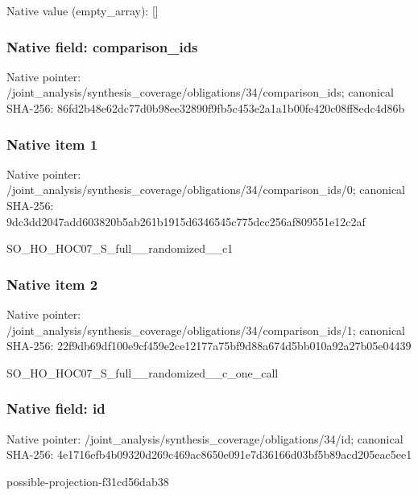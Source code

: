 \documentclass[10pt,a4paper]{article}
\begin{document}
Native value (empty\_\allowbreak{}array): []

\subsubsection{Native field: comparison\_\allowbreak{}ids}
Native pointer: /joint\_\allowbreak{}analysis/synthesis\_\allowbreak{}coverage/obligations/34/comparison\_\allowbreak{}ids; canonical SHA-256: 86fd2b48e62dc77d0b98ee32890f9fb5c453e2a1a1b00fe420c08ff8edc4d86b

\subsubsection{Native item 1}
Native pointer: /joint\_\allowbreak{}analysis/synthesis\_\allowbreak{}coverage/obligations/34/comparison\_\allowbreak{}ids/0; canonical SHA-256: 9dc3dd2047add603820b5ab261b1915d6346545c775dcc256af809551e12c2af

\begingroup\raggedright\sloppy SO\_\allowbreak{}HO\_\allowbreak{}HOC07\_\allowbreak{}S\_\allowbreak{}full\_\allowbreak{}\_\allowbreak{}randomized\_\allowbreak{}\_\allowbreak{}c1\par\endgroup

\subsubsection{Native item 2}
Native pointer: /joint\_\allowbreak{}analysis/synthesis\_\allowbreak{}coverage/obligations/34/comparison\_\allowbreak{}ids/1; canonical SHA-256: 22f9db69df100e9cf459e2ce12177a75bf9d88a674d5bb010a92a27b05e04439

\begingroup\raggedright\sloppy SO\_\allowbreak{}HO\_\allowbreak{}HOC07\_\allowbreak{}S\_\allowbreak{}full\_\allowbreak{}\_\allowbreak{}randomized\_\allowbreak{}\_\allowbreak{}c\_\allowbreak{}one\_\allowbreak{}call\par\endgroup

\subsubsection{Native field: id}
Native pointer: /joint\_\allowbreak{}analysis/synthesis\_\allowbreak{}coverage/obligations/34/id; canonical SHA-256: 4e1716efb4b09320d269c469ac8650e091e7d36166d03bf5b89acd205eac5ee1

\begingroup\raggedright\sloppy possible-projection-f31cd56dab38\par\endgroup
\end{document}
